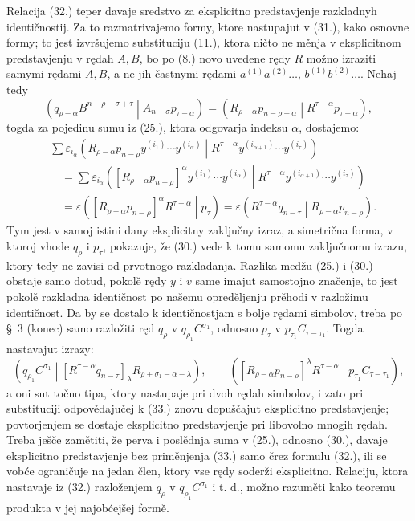 \documentclass[11pt]{article}
\newcommand{\pair}[2]{\left(#1\middle|#2\right)}
\newcommand{\eps}{\varepsilon}
\begin{document}
Relacija (32.) teper davaje sredstvo za eksplicitno predstavjenje razkladnyh identičnostij. Za to razmatrivajemo formy, ktore nastupajut v (31.), kako osnovne formy; to jest izvršujemo substituciju (11.), ktora ničto ne měnja v eksplicitnom predstavjenju v rędah $A,B$, bo po (8.) novo uvedene rędy $R$ možno izraziti samymi rędami $A,B$, a ne jih častnymi rędami $a^{(1)}a^{(2)}\ldots$, $b^{(1)}b^{(2)}\ldots$. Nehaj tedy
\begin{equation}
 \pair{q_{\rho-\alpha}B^{n-\rho-\sigma+\tau}}{A_{n-\sigma}p_{\tau-\alpha}}
 =\pair{R_{\rho-\alpha}p_{n-\rho+\alpha}}{R^{\tau-\alpha}p_{\tau-\alpha}},
\tag{33}
\end{equation}
togda za pojedinu sumu iz (25.), ktora odgovarja indeksu $\alpha$, dostajemo:
\begin{equation}
\begin{aligned}
&\sum \eps_{i_\alpha}
\pair{R_{\rho-\alpha}p_{n-\rho}y^{(i_1)}\cdots y^{(i_\alpha)}}
{R^{\tau-\alpha}y^{(i_{\alpha+1})}\cdots y^{(i_\tau)}}\\
&\quad=\sum \eps_{i_\alpha}
\pair{[R_{\rho-\alpha}p_{n-\rho}]^\alpha
y^{(i_1)}\cdots y^{(i_\alpha)}}
{R^{\tau-\alpha}y^{(i_{\alpha+1})}\cdots y^{(i_\tau)}}\\
&\quad=\eps\pair{[R_{\rho-\alpha}p_{n-\rho}]^\alpha R^{\tau-\alpha}}{p_\tau}
 =\eps\pair{R^{\tau-\alpha}q_{n-\tau}}{R_{\rho-\alpha}p_{n-\rho}}.
\end{aligned}
\tag{34}
\end{equation}
Tym jest v samoj istini dany eksplicitny zaključny izraz, a simetrična forma, v ktoroj vhode $q_\rho$ i $p_\tau$, pokazuje, že (30.) vede k tomu samomu zaključnomu izrazu, ktory tedy ne zavisi od prvotnogo razkladanja. Razlika medžu (25.) i (30.) obstaje samo dotud, pokolě rędy $y$ i $v$ same imajut samostojno značenje, to jest pokolě razkladna identičnost po našemu opreděljenju prěhodi v razložimu identičnost. Da by se dostalo k identičnostjam s bolje rędami simbolov, treba po \S\ 3 (konec) samo razložiti ręd $q_\rho$ v $q_{\rho_1}C^{\sigma_1}$, odnosno $p_\tau$ v $p_{\tau_1}C_{\tau-\tau_1}$. Togda nastavajut izrazy:
\begin{equation}
 \pair{q_{\rho_1}C^{\sigma_1}}
 {[R^{\tau-\alpha}q_{n-\tau}]_\lambda R_{\rho+\sigma_1-\alpha-\lambda}},
 \qquad
 \pair{[R_{\rho-\alpha}p_{n-\rho}]^\lambda R^{\tau-\alpha}}
 {p_{\tau_1}C_{\tau-\tau_1}},
\tag{35}
\end{equation}
a oni sut točno tipa, ktory nastupaje pri dvoh rędah simbolov, i zato pri substituciji odpovědajučej k (33.) znovu dopuščajut eksplicitno predstavjenje; povtorjenjem se dostaje eksplicitno predstavjenje pri libovolno mnogih rędah. Treba ješče zamětiti, že perva i poslědnja suma v (25.), odnosno (30.), davaje eksplicitno predstavjenje bez priměnjenja (33.) samo črez formulu (32.), ili se vobće ograničuje na jedan člen, ktory vse rędy soderži eksplicitno. Relaciju, ktora nastavaje iz (32.) razloženjem $q_\rho$ v $q_{\rho_1}C^{\sigma_1}$ i t. d., možno razuměti kako teoremu produkta v jej najobćejšej formě.
\end{document}
